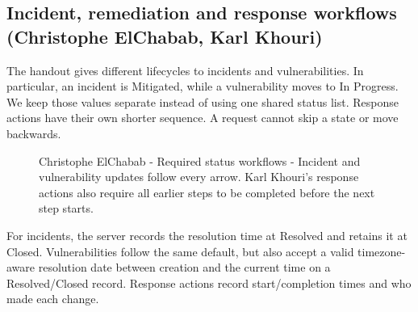 \subsection{Incident, remediation and response workflows (Christophe ElChabab, Karl Khouri)}
The handout gives different lifecycles to incidents and vulnerabilities. In particular, an incident is Mitigated, while a vulnerability moves to In Progress. We keep those values separate instead of using one shared status list. Response actions have their own shorter sequence. A request cannot skip a state or move backwards.

\begin{figure}[H]\centering
{}
\caption{Christophe ElChabab - Required status workflows - Incident and vulnerability updates follow every arrow. Karl Khouri's response actions also require all earlier steps to be completed before the next step starts.}
\label{fig:workflows}
\end{figure}

For incidents, the server records the resolution time at Resolved and retains it at Closed. Vulnerabilities follow the same default, but also accept a valid timezone-aware resolution date between creation and the current time on a Resolved/Closed record. Response actions record start/completion times and who made each change.
